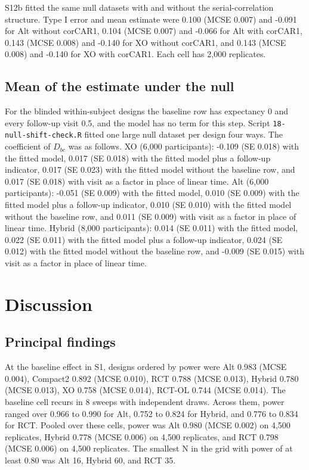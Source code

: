 \documentclass[
  11pt,
]{article}
\begin{document}
S12b fitted the same null datasets with and without the serial-correlation structure. Type I error and mean estimate were 0.100 (MCSE 0.007) and -0.091 for Alt without corCAR1, 0.104 (MCSE 0.007) and -0.066 for Alt with corCAR1, 0.143 (MCSE 0.008) and -0.140 for XO without corCAR1, and 0.143 (MCSE 0.008) and -0.140 for XO with corCAR1. Each cell has 2,000 replicates.

\subsection{Mean of the estimate under the null}\label{nullshift}

For the blinded within-subject designs the baseline row has expectancy 0 and every follow-up visit 0.5, and the model has no term for this step. Script \texttt{18-null-shift-check.R} fitted one large null dataset per design four ways. The coefficient of \(D_{bc}\) was as follows. XO (6,000 participants): -0.109 (SE 0.018) with the fitted model, 0.017 (SE 0.018) with the fitted model plus a follow-up indicator, 0.017 (SE 0.023) with the fitted model without the baseline row, and 0.017 (SE 0.018) with visit as a factor in place of linear time. Alt (6,000 participants): -0.051 (SE 0.009) with the fitted model, 0.010 (SE 0.009) with the fitted model plus a follow-up indicator, 0.010 (SE 0.010) with the fitted model without the baseline row, and 0.011 (SE 0.009) with visit as a factor in place of linear time. Hybrid (8,000 participants): 0.014 (SE 0.011) with the fitted model, 0.022 (SE 0.011) with the fitted model plus a follow-up indicator, 0.024 (SE 0.012) with the fitted model without the baseline row, and -0.009 (SE 0.015) with visit as a factor in place of linear time.

\section{Discussion}\label{discussion}

\subsection{Principal findings}\label{principal-findings}

At the baseline effect in S1, designs ordered by power were Alt 0.983 (MCSE 0.004), Compact2 0.892 (MCSE 0.010), RCT 0.788 (MCSE 0.013), Hybrid 0.780 (MCSE 0.013), XO 0.758 (MCSE 0.014), RCT-OL 0.744 (MCSE 0.014). The baseline cell recurs in 8 sweeps with independent draws. Across them, power ranged over 0.966 to 0.990 for Alt, 0.752 to 0.824 for Hybrid, and 0.776 to 0.834 for RCT. Pooled over these cells, power was Alt 0.980 (MCSE 0.002) on 4,500 replicates, Hybrid 0.778 (MCSE 0.006) on 4,500 replicates, and RCT 0.798 (MCSE 0.006) on 4,500 replicates. The smallest N in the grid with power of at least 0.80 was Alt 16, Hybrid 60, and RCT 35.
\end{document}
